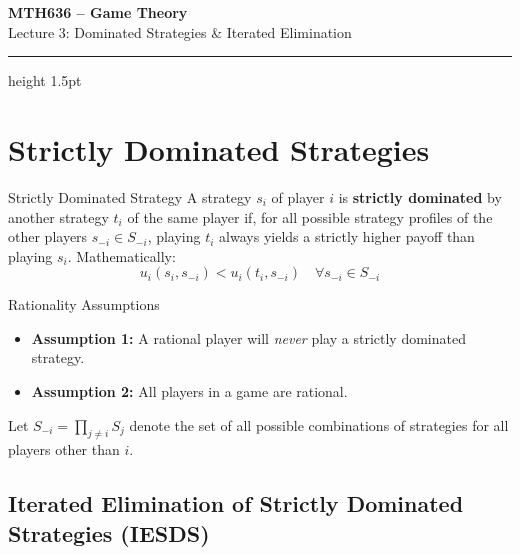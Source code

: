 \documentclass[12pt, a4paper]{article}
\begin{document}
\begin{center}
  {\LARGE\bfseries\sffamily\color{defblue} MTH636 -- Game Theory}\\[6pt]
  {\Large\sffamily Lecture 3: Dominated Strategies \& Iterated Elimination}\\[4pt]
\end{center}
\vspace{0.5cm}
\hrule height 1.5pt
\vspace{0.3cm}

\section{Strictly Dominated Strategies}

\begin{defbox}{Strictly Dominated Strategy}
  A strategy $s_i$ of player $i$ is \textbf{strictly dominated} by another strategy $t_i$ of the same player if, for all possible strategy profiles of the other players $s_{-i} \in S_{-i}$, playing $t_i$ always yields a strictly higher payoff than playing $s_i$. Mathematically:
  \[
    u_i(s_i, s_{-i}) < u_i(t_i, s_{-i}) \quad \forall s_{-i} \in S_{-i}
  \]
\end{defbox}

\begin{warnbox}{Rationality Assumptions}
  \begin{itemize}[leftmargin=*]
    \item \textbf{Assumption 1:} A rational player will \emph{never} play a strictly dominated strategy.
    \item \textbf{Assumption 2:} All players in a game are rational.
  \end{itemize}
\end{warnbox}

Let $S_{-i} = \prod_{j \neq i} S_j$ denote the set of all possible combinations of strategies for all players other than $i$.

\subsection{Iterated Elimination of Strictly Dominated Strategies (IESDS)}
\end{document}
